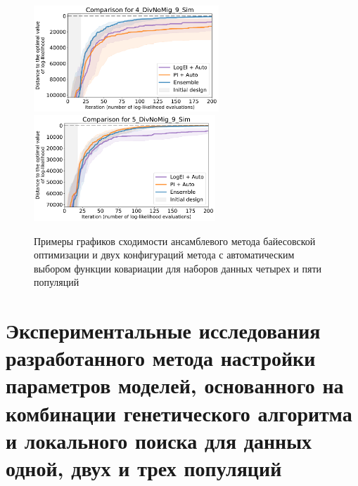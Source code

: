 \begin{figure}
    \centering
        \includegraphics[height=4.0cm]{images_experiments/bo_hpo/BO_Ens/4_DivNoMig_9_Sim_comp.pdf}
        \includegraphics[height=4.0cm]{images_experiments/bo_hpo/BO_Ens/5_DivNoMig_9_Sim_comp.pdf}
    \caption{Примеры графиков сходимости ансамблевого метода байесовской оптимизации и двух конфигураций метода с автоматическим выбором функции ковариации для наборов данных четырех и пяти популяций}
    \label{fig:part2:bo_hpo:bo_ens}
\end{figure}




\section{Экспериментальные исследования разработанного метода настройки параметров моделей, основанного на комбинации генетического алгоритма и локального поиска для данных одной, двух и трех популяций}
\label{sec:part2:experiments:genetic_algorithm}

